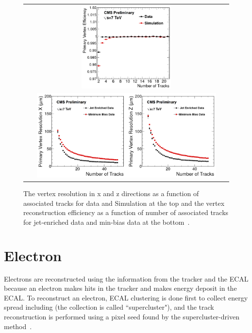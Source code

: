 \begin{figure}[htp] 
\centering 
\begin{tabular}{c} 
\includegraphics[width=0.45\textwidth]{figures/PrimaryVertexTagAndProbeEfficiency.png} \\ 
\includegraphics[width=0.9\textwidth]{figures/PrimaryVertexResolutions.png}  
\end{tabular} 
\caption{The vertex resolution in x and z directions as a function of associated tracks
for data and Simulation at the top 
and the vertex reconstruction efficiency as a function of number of associated tracks
for jet-enriched data and min-bias data at the bottom~\cite{muonTrkPerform}. }
\label{fig:VtxEff} 
\end{figure} 

\section{ Electron }
\label{sec:electron_reco}

Electrons are reconstructed using the information from the tracker and the ECAL 
because an electron makes hits in the tracker and makes energy deposit in the ECAL.
To reconstruct an electron, ECAL clustering is done first to collect energy 
spread including \brem(the collection is called ``supercluster"), 
and the track reconstruction is performed using a pixel seed found 
by the supercluster-driven method~\cite{Baffioni:2006cd}.  
 
